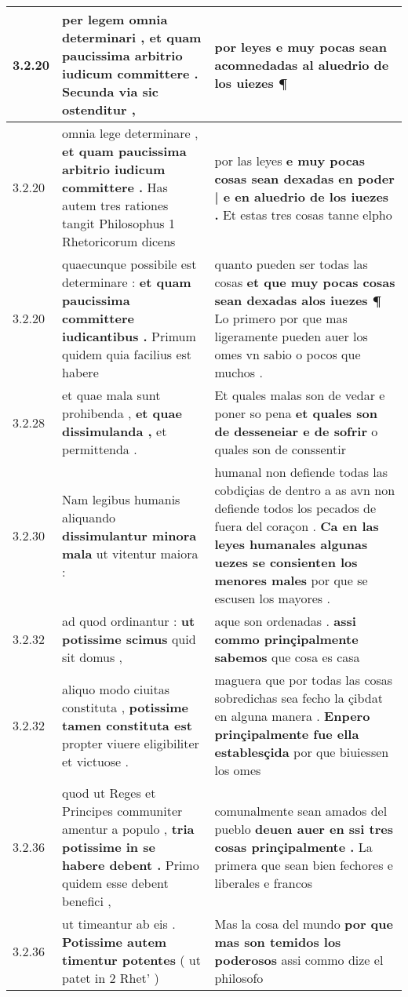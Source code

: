 \begin{tabular}{|p{1cm}|p{6.5cm}|p{6.5cm}|}
3.2.20 & per legem omnia determinari , \textbf{ et quam paucissima arbitrio iudicum committere . } Secunda via sic ostenditur , & por leyes \textbf{ e muy pocas sean acomnedadas al aluedrio de los uiezes } ¶ \\\hline
3.2.20 & omnia lege determinare , \textbf{ et quam paucissima arbitrio iudicum committere . } Has autem tres rationes tangit Philosophus 1 Rhetoricorum dicens & por las leyes \textbf{ e muy pocas cosas sean dexadas en poder | e en aluedrio de los iuezes . } Et estas tres cosas tanne elpho \\\hline
3.2.20 & quaecunque possibile est determinare : \textbf{ et quam paucissima committere iudicantibus . } Primum quidem quia facilius est habere & quanto pueden ser todas las cosas \textbf{ et que muy pocas cosas sean dexadas alos iuezes ¶ } Lo primero por que mas ligeramente pueden auer los omes vn sabio o pocos que muchos . \\\hline
3.2.28 & et quae mala sunt prohibenda , \textbf{ et quae dissimulanda , } et permittenda . & Et quales malas son de vedar e poner so pena \textbf{ et quales son de desseneiar e de sofrir } o quales son de conssentir \\\hline
3.2.30 & Nam legibus humanis aliquando \textbf{ dissimulantur minora mala } ut vitentur maiora : & humanal non defiende todas las cobdiçias de dentro a as avn non defiende todos los pecados de fuera del coraçon . \textbf{ Ca en las leyes humanales algunas uezes se consienten los menores males } por que se escusen los mayores . \\\hline
3.2.32 & ad quod ordinantur : \textbf{ ut potissime scimus } quid sit domus , & aque son ordenadas . \textbf{ assi commo prinçipalmente sabemos } que cosa es casa \\\hline
3.2.32 & aliquo modo ciuitas constituta , \textbf{ potissime tamen constituta est } propter viuere eligibiliter et victuose . & maguera que por todas las cosas sobredichas sea fecho la çibdat en alguna manera . \textbf{ Enpero prinçipalmente fue ella establesçida } por que biuiessen los omes \\\hline
3.2.36 & quod ut Reges et Principes communiter amentur a populo , \textbf{ tria potissime in se habere debent . } Primo quidem esse debent benefici , & comunalmente sean amados del pueblo \textbf{ deuen auer en ssi tres cosas prinçipalmente . } La primera que sean bien fechores e liberales e francos \\\hline
3.2.36 & ut timeantur ab eis . \textbf{ Potissime autem timentur potentes } ( ut patet in 2 Rhet’ ) & Mas la cosa del mundo \textbf{ por que mas son temidos los poderosos } assi commo dize el philosofo \\\hline

\end{tabular}
